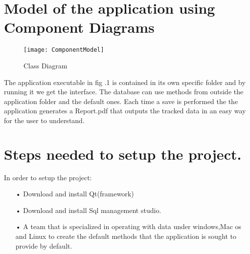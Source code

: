 
\setlength{\parindent}{2ex}
\section{Model of the application using Component Diagrams}
\par
\begin{figure}[h!]
	\centering
	\texttt{[image: ComponentModel]}
	\caption{Class Diagram} 
\end{figure}
The application executable in fig \thesection.1 is contained in its own specific folder and by running it we get the interface.
The database can use methods from outside the application folder and the default ones.
Each time a save is performed the the application generates a Report.pdf that outputs the tracked data in an easy way for the user to understand.
\newpage
\section{Steps needed to setup the project.}
In order to setup the project:
\begin{itemize}
\item[•] Download and install Qt(framework)
\item[•] Download and install Sql management studio.
\item[•] A team that is specialized in operating with data under windows,Mac os and Linux to create the default methods that the application is sought to provide by default.
\end{itemize}

\clearpage
